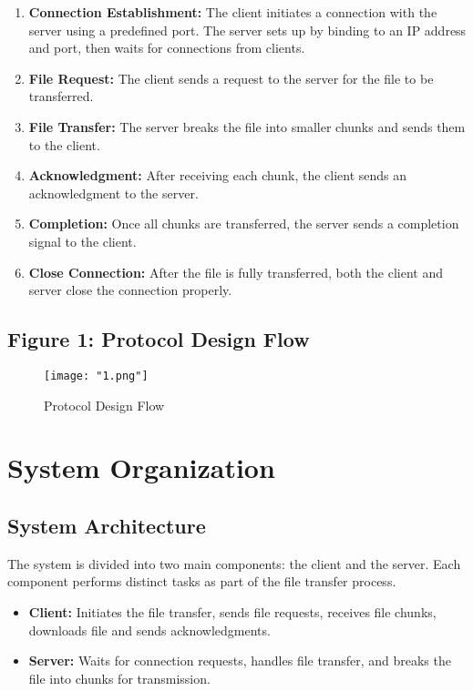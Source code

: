 \documentclass[a4paper,12pt]{article}
\begin{document}
\begin{enumerate}
    \item \textbf{Connection Establishment:} The client initiates a connection with the server using a predefined port. The server sets up by binding to an IP address and port, then waits for
    connections from clients.
    \item \textbf{File Request:} The client sends a request to the server for the file to be transferred.
    \item \textbf{File Transfer:} The server breaks the file into smaller chunks and sends them to the client.
    \item \textbf{Acknowledgment:} After receiving each chunk, the client sends an acknowledgment to the server.
    \item \textbf{Completion:} Once all chunks are transferred, the server sends a completion signal to the client.
    \item \textbf{Close Connection:} After the file is fully transferred, both the client and server close the connection properly.
\end{enumerate}

\subsection{Figure 1: Protocol Design Flow}
\begin{figure}[ht!]
    \centering
    \texttt{[image: "1.png"]}
    \caption{Protocol Design Flow}
    \label{fig:protocol_design}
\end{figure}

\section{System Organization}
\subsection{System Architecture}
The system is divided into two main components: the client and the server. Each component performs distinct tasks as part of the file transfer process.

\begin{itemize}
    \item \textbf{Client:} Initiates the file transfer, sends file requests, receives file chunks, downloads file and sends acknowledgments.
    \item \textbf{Server:} Waits for connection requests, handles file transfer, and breaks the file into chunks for transmission. 
\end{itemize}
\end{document}
